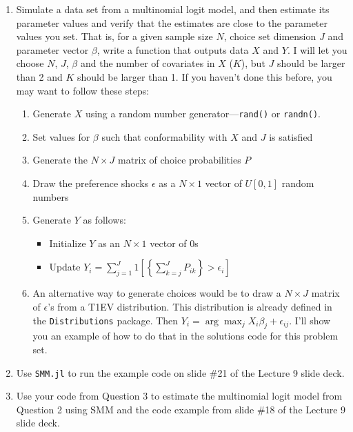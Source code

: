 \documentclass[12pt,english]{article}
\begin{document}
\begin{enumerate}
\item Simulate a data set from a multinomial logit model, and then estimate its parameter values and verify that the estimates are close to the parameter values you set. That is, for a given sample size $N$, choice set dimension $J$ and parameter vector $\beta$, write a function that outputs data $X$ and $Y$. I will let you choose $N$, $J$, $\beta$ and the number of covariates in $X$ ($K$), but $J$ should be larger than 2 and $K$ should be larger than 1. If you haven't done this before, you may want to follow these steps:
    \begin{enumerate}
    \item Generate $X$ using a random number generator---\texttt{rand()} or \texttt{randn()}.
    \item Set values for $\beta$ such that conformability with $X$ and $J$ is satisfied
    \item Generate the $N\times J$ matrix of choice probabilities $P$
    \item Draw the preference shocks $\epsilon$ as a $N\times 1$ vector of $U[0,1]$ random numbers
    \item Generate $Y$ as follows:
        \begin{itemize}
        \item Initialize $Y$ as an $N\times 1$ vector of 0s
        \item Update $Y_i = \sum_{j=1}^J 1\left[\left\{\sum_{k=j}^J  P_{ik}\right\} > 
        \epsilon_i\right]$
        \end{itemize}
    \item An alternative way to generate choices would be to draw a $N\times J$ matrix of $\epsilon$'s from a T1EV distribution. This distribution is already defined in the \texttt{Distributions} package. Then $Y_i = \arg \max_{j} X_i \beta_j + \epsilon_{ij}$. I'll show you an example of how to do that in the solutions code for this problem set.
    \end{enumerate}
\item Use \texttt{SMM.jl} to run the example code on slide \#21 of the Lecture 9 slide deck.

\item Use your code from Question 3 to estimate the multinomial logit model from Question 2 using SMM and the code example from slide \#18 of the Lecture 9 slide deck.

\end{enumerate}
\end{document}
